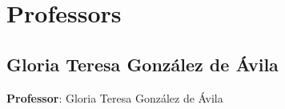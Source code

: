 \documentclass{article}
\begin{document}
            


            \tableofcontents
            \clearpage  %

            \setcounter{page}{1}

            
        \section{Professors} 

        \subsection{Gloria Teresa Gonz\'alez de \'Avila}
        \vspace*{.1cm}
        
        \begin{flushright}
            {\LARGE \textbf{Professor}: Gloria Teresa Gonz\'alez de \'Avila}
        \end{flushright}
        \vspace{1cm}
\end{document}
